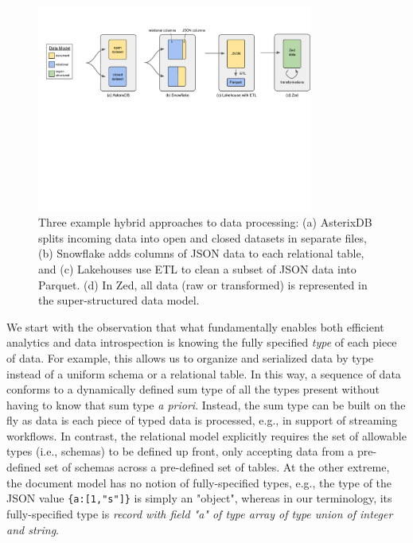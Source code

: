 \begin{figure}[t]
    \centering
    \includegraphics[width=0.81\textwidth]{figures/hybrid_approaches.pdf}
    \vspace{-1.3em}
    \caption{Three example hybrid approaches to data processing: (a) AsterixDB splits incoming data into open and closed datasets in separate files, (b) Snowflake adds columns of JSON data to each relational table, and (c) Lakehouses use ETL to clean a subset of JSON data into Parquet. (d) In Zed, all data (raw or transformed) is represented in the super-structured data model.}
    \label{f:hybrid_approaches}
    \vspace{-1.6em}
\end{figure}

We start with the observation that what fundamentally enables both efficient analytics and data introspection is knowing the fully specified {\em type} of each piece of data. For example, this allows us to organize and serialized data by type instead of a uniform schema or a relational table.  In this way, a sequence of data conforms to a dynamically defined sum type of all the types present without having to know that sum type {\em a priori}.  Instead, the sum type can be built on the fly as data is each piece of typed data is processed, e.g., in support of streaming workflows.  In contrast, the relational model explicitly requires the set of allowable types (i.e., schemas) to be defined up front, only accepting data from a pre-defined set of schemas across a pre-defined set of tables.  At the other extreme, the document model has no notion of fully-specified types, e.g., the type of the JSON value {\tt \{a:[1,"s"]\}} is simply an "object", whereas in our terminology, its fully-specified type is {\em record with field "a" of type array of type union of integer and string}. 

